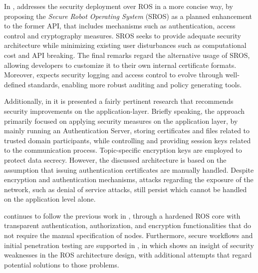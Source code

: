 In , \citeauthor{white2016sros} addresses the security deployment over ROS in a more concise way, by proposing the \textit{Secure Robot Operating System} (SROS) as a planned enhancement to the former API, that includes mechanisms such as authentication, access control and cryptography measures. SROS seeks to provide adequate security architecture while minimizing existing user disturbances such as computational cost and API breaking. The final remarks regard the alternative usage of SROS, allowing developers to customize it to their own internal certificate formats. Moreover, \citeauthor{white2016sros} expects security logging and access control to evolve through well-defined standards, enabling more robust auditing and policy generating tools. 

Additionally, in  it is presented a fairly pertinent research that recommends security improvements on the application-layer. Briefly speaking, the approach primarily focused on applying security measures on the application layer, by mainly running an Authentication Server, storing certificates and files related to trusted domain participants, while controlling and providing session keys related to the communication process. Topic-specific encryption keys are employed to protect data secrecy. However, the discussed architecture is based on the assumption that issuing authentication certificates are manually handled. Despite encryption and authentication mechanisms, attacks regarding the exposure of the network, such as denial of service attacks, still persist which cannot be handled on the application level alone. 

\citeauthor*{breiling2017secure} continues to follow the previous work in , through a hardened ROS core with transparent authentication, authorization, and encryption functionalities that do not require the manual specification of nodes. Furthermore, secure workflows and initial penetration testing are supported in , in which \citeauthor{dieber2017security} shows an insight of security weaknesses in the ROS architecture design, with additional attempts that regard potential solutions to those problems.

